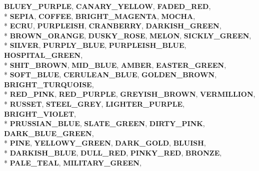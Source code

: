 \begin{DoxyCompactItemize}
{\bfseries B\+L\+U\+E\+Y\+\_\+\+P\+U\+R\+P\+LE}, 
{\bfseries C\+A\+N\+A\+R\+Y\+\_\+\+Y\+E\+L\+L\+OW}, 
{\bfseries F\+A\+D\+E\+D\+\_\+\+R\+ED}, 
\\*
{\bfseries S\+E\+P\+IA}, 
{\bfseries C\+O\+F\+F\+EE}, 
{\bfseries B\+R\+I\+G\+H\+T\+\_\+\+M\+A\+G\+E\+N\+TA}, 
{\bfseries M\+O\+C\+HA}, 
\\*
{\bfseries E\+C\+RU}, 
{\bfseries P\+U\+R\+P\+L\+E\+I\+SH}, 
{\bfseries C\+R\+A\+N\+B\+E\+R\+RY}, 
{\bfseries D\+A\+R\+K\+I\+S\+H\+\_\+\+G\+R\+E\+EN}, 
\\*
{\bfseries B\+R\+O\+W\+N\+\_\+\+O\+R\+A\+N\+GE}, 
{\bfseries D\+U\+S\+K\+Y\+\_\+\+R\+O\+SE}, 
{\bfseries M\+E\+L\+ON}, 
{\bfseries S\+I\+C\+K\+L\+Y\+\_\+\+G\+R\+E\+EN}, 
\\*
{\bfseries S\+I\+L\+V\+ER}, 
{\bfseries P\+U\+R\+P\+L\+Y\+\_\+\+B\+L\+UE}, 
{\bfseries P\+U\+R\+P\+L\+E\+I\+S\+H\+\_\+\+B\+L\+UE}, 
{\bfseries H\+O\+S\+P\+I\+T\+A\+L\+\_\+\+G\+R\+E\+EN}, 
\\*
{\bfseries S\+H\+I\+T\+\_\+\+B\+R\+O\+WN}, 
{\bfseries M\+I\+D\+\_\+\+B\+L\+UE}, 
{\bfseries A\+M\+B\+ER}, 
{\bfseries E\+A\+S\+T\+E\+R\+\_\+\+G\+R\+E\+EN}, 
\\*
{\bfseries S\+O\+F\+T\+\_\+\+B\+L\+UE}, 
{\bfseries C\+E\+R\+U\+L\+E\+A\+N\+\_\+\+B\+L\+UE}, 
{\bfseries G\+O\+L\+D\+E\+N\+\_\+\+B\+R\+O\+WN}, 
{\bfseries B\+R\+I\+G\+H\+T\+\_\+\+T\+U\+R\+Q\+U\+O\+I\+SE}, 
\\*
{\bfseries R\+E\+D\+\_\+\+P\+I\+NK}, 
{\bfseries R\+E\+D\+\_\+\+P\+U\+R\+P\+LE}, 
{\bfseries G\+R\+E\+Y\+I\+S\+H\+\_\+\+B\+R\+O\+WN}, 
{\bfseries V\+E\+R\+M\+I\+L\+L\+I\+ON}, 
\\*
{\bfseries R\+U\+S\+S\+ET}, 
{\bfseries S\+T\+E\+E\+L\+\_\+\+G\+R\+EY}, 
{\bfseries L\+I\+G\+H\+T\+E\+R\+\_\+\+P\+U\+R\+P\+LE}, 
{\bfseries B\+R\+I\+G\+H\+T\+\_\+\+V\+I\+O\+L\+ET}, 
\\*
{\bfseries P\+R\+U\+S\+S\+I\+A\+N\+\_\+\+B\+L\+UE}, 
{\bfseries S\+L\+A\+T\+E\+\_\+\+G\+R\+E\+EN}, 
{\bfseries D\+I\+R\+T\+Y\+\_\+\+P\+I\+NK}, 
{\bfseries D\+A\+R\+K\+\_\+\+B\+L\+U\+E\+\_\+\+G\+R\+E\+EN}, 
\\*
{\bfseries P\+I\+NE}, 
{\bfseries Y\+E\+L\+L\+O\+W\+Y\+\_\+\+G\+R\+E\+EN}, 
{\bfseries D\+A\+R\+K\+\_\+\+G\+O\+LD}, 
{\bfseries B\+L\+U\+I\+SH}, 
\\*
{\bfseries D\+A\+R\+K\+I\+S\+H\+\_\+\+B\+L\+UE}, 
{\bfseries D\+U\+L\+L\+\_\+\+R\+ED}, 
{\bfseries P\+I\+N\+K\+Y\+\_\+\+R\+ED}, 
{\bfseries B\+R\+O\+N\+ZE}, 
\\*
{\bfseries P\+A\+L\+E\+\_\+\+T\+E\+AL}, 
{\bfseries M\+I\+L\+I\+T\+A\+R\+Y\+\_\+\+G\+R\+E\+EN}, 

\end{DoxyCompactItemize}
